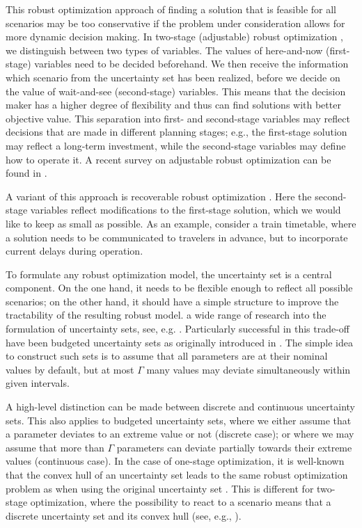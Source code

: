 This robust optimization approach of finding a solution that is feasible for all scenarios may be too conservative if the problem under consideration allows for more dynamic decision making. In two-stage (adjustable) robust optimization \cite{ben2004adjustable}, we distinguish between two types of variables. The values of here-and-now (first-stage) variables need to be decided beforehand. We then receive the information which scenario from the uncertainty set has been realized, before we decide on the value of wait-and-see (second-stage) variables. This means that the decision maker has a higher degree of flexibility and thus can find solutions with better objective value. This separation into first- and second-stage variables may reflect decisions that are made in different planning stages; e.g., the first-stage solution may reflect a long-term investment, while the second-stage variables may define how to operate it. A recent survey on adjustable robust optimization can be found in \cite{yanikouglu2019survey}.

A variant of this approach is recoverable robust optimization \cite{liebchen2009concept}. Here the second-stage variables reflect modifications to the first-stage solution, which we would like to keep as small as possible. As an example, consider a train timetable, where a solution needs to be communicated to travelers in advance, but  to incorporate current delays during operation.

To formulate any robust optimization model, the uncertainty set is a central component. On the one hand, it needs to be flexible enough to reflect all possible scenarios; on the other hand, it should have a simple structure to improve the tractability of the resulting robust model.  a wide range of research into the formulation of uncertainty sets, see, e.g. \cite{bertsimas2009constructing}. Particularly successful in this trade-off have been budgeted uncertainty sets as originally introduced in \cite{bertsimas2003robust,bertsimas2004price}. The simple idea to construct such sets is to assume that all parameters are at their nominal values by default, but at most $\Gamma$ many values may deviate simultaneously within given intervals.

A high-level distinction can be made between discrete and continuous uncertainty sets. This also applies to budgeted uncertainty sets, where we either assume that a parameter deviates to an extreme value or not (discrete case); or where we may assume that more than $\Gamma$ parameters can deviate partially towards their extreme values (continuous case). In the case of one-stage optimization, it is well-known that the convex hull of an uncertainty set leads to the same robust optimization problem as when using the original uncertainty set \cite{yanikouglu2019survey}. This is different for two-stage optimization, where the possibility to react to a scenario means that  a discrete uncertainty set and its convex hull (see, e.g., \cite{chassein2018recoverable}).

